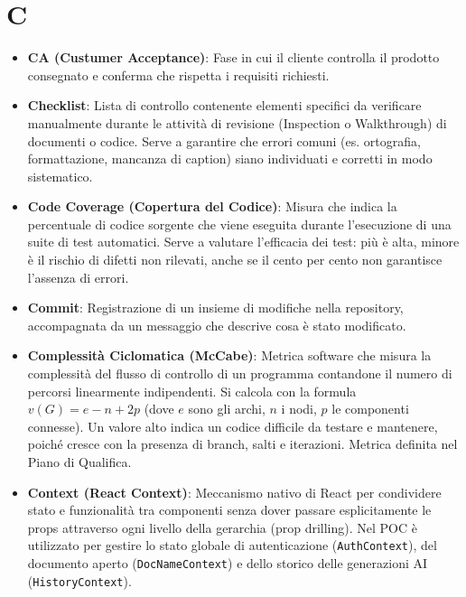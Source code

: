 \documentclass[11pt,a4paper]{article}
\begin{document}
\section*{C}
\begin{itemize}

\item \textbf{CA (Custumer Acceptance)}: Fase in cui il cliente controlla il prodotto consegnato e conferma che rispetta i requisiti richiesti.

\item \textbf{Checklist}: Lista di controllo contenente elementi specifici da verificare manualmente durante le attività di revisione (Inspection o Walkthrough) di documenti o codice. Serve a garantire che errori comuni (es. ortografia, formattazione, mancanza di caption) siano individuati e corretti in modo sistematico.

\item \textbf{Code Coverage (Copertura del Codice)}: Misura che indica la percentuale di codice sorgente che viene eseguita durante l'esecuzione di una suite di test automatici.
Serve a valutare l'efficacia dei test: più è alta, minore è il rischio di difetti non rilevati, anche se il cento per cento non garantisce l'assenza di errori.

\item \textbf{Commit}: Registrazione di un insieme di modifiche nella repository, accompagnata da un messaggio che descrive cosa è stato modificato.

\item \textbf{Complessità Ciclomatica (McCabe)}: Metrica software che misura la complessità del flusso di controllo di un programma contandone il numero di percorsi linearmente indipendenti. Si calcola con la formula $v(G)=e-n+2p$ (dove $e$ sono gli archi, $n$ i nodi, $p$ le componenti connesse). Un valore alto indica un codice difficile da testare e mantenere, poiché cresce con la presenza di branch, salti e iterazioni. Metrica definita nel Piano di Qualifica.

\item \textbf{Context (React Context)}: Meccanismo nativo di React per 
condividere stato e funzionalità tra componenti senza dover passare  esplicitamente le props attraverso ogni livello della gerarchia (prop drilling). Nel POC è utilizzato per gestire lo stato globale  di autenticazione (\texttt{AuthContext}), del documento aperto  (\texttt{DocNameContext}) e dello storico delle generazioni AI  (\texttt{HistoryContext}).


\end{itemize}
\end{document}
